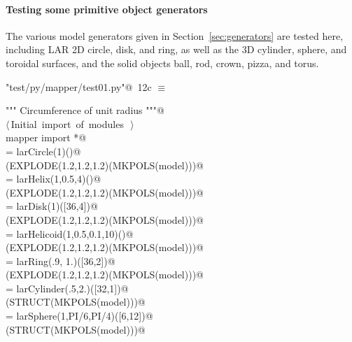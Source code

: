 \documentclass[11pt,oneside]{article}	%
\begin{document}
\paragraph{Testing some primitive object generators}
The various model generators given in Section~\ref{sec:generators} are tested here, including LAR 2D circle, disk, and ring, as well as the 3D cylinder, sphere, and toroidal surfaces, and the solid objects ball, rod, crown, pizza, and torus.

\begin{flushleft} \small \label{scrap26}
\protect{}\verb@"test/py/mapper/test01.py"@\nobreak\ {\footnotesize 12c }$\equiv$
\vspace{-1ex}
\begin{list}{}{} \item
\mbox{}\verb@""" Circumference of unit radius """@\\
\mbox{}\verb@@\hbox{$\langle\,$Initial import of modules\nobreak\ {\footnotesize {}}$\,\rangle$}\verb@@\\
\mbox{}\verb@from mapper import *@\\
\mbox{}\verb@model = larCircle(1)()@\\
\mbox{}\verb@VIEW(EXPLODE(1.2,1.2,1.2)(MKPOLS(model)))@\\
\mbox{}\verb@model = larHelix(1,0.5,4)()@\\
\mbox{}\verb@VIEW(EXPLODE(1.2,1.2,1.2)(MKPOLS(model)))@\\
\mbox{}\verb@model = larDisk(1)([36,4])@\\
\mbox{}\verb@VIEW(EXPLODE(1.2,1.2,1.2)(MKPOLS(model)))@\\
\mbox{}\verb@model = larHelicoid(1,0.5,0.1,10)()@\\
\mbox{}\verb@VIEW(EXPLODE(1.2,1.2,1.2)(MKPOLS(model)))@\\
\mbox{}\verb@model = larRing(.9, 1.)([36,2])@\\
\mbox{}\verb@VIEW(EXPLODE(1.2,1.2,1.2)(MKPOLS(model)))@\\
\mbox{}\verb@model = larCylinder(.5,2.)([32,1])@\\
\mbox{}\verb@VIEW(STRUCT(MKPOLS(model)))@\\
\mbox{}\verb@model = larSphere(1,PI/6,PI/4)([6,12])@\\
\mbox{}\verb@VIEW(STRUCT(MKPOLS(model)))@\\

\end{list}
\end{flushleft}
\end{document}
